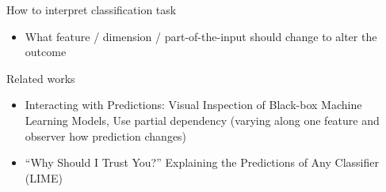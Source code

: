 How to interpret classification task
\begin{itemize}
    \item What feature / dimension / part-of-the-input should change to
    alter the outcome

\end{itemize}

Related works
\begin{itemize}
    \item Interacting with Predictions: Visual Inspection of Black-box Machine Learning Models,
    Use partial dependency (varying along one feature and observer how prediction changes)
    \item “Why Should I Trust You?” Explaining the Predictions of Any Classifier (LIME)

\end{itemize}
